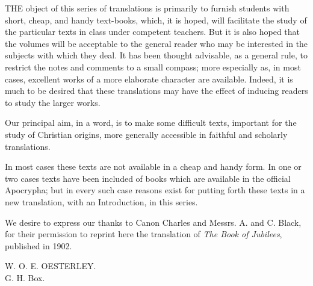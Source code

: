 
THE object of this series of translations is primarily to furnish students with short, cheap, and handy text-books, which, it is hoped, will facilitate the study of the particular texts in class under competent teachers. But it is also hoped that the volumes will be acceptable to the general reader who may be interested in the subjects with which they deal. It has been thought advisable, as a general rule, to restrict the notes and comments to a small compass; more especially as, in most cases, excellent works of a more elaborate character are available. Indeed, it is much to be desired that these translations may have the effect of inducing readers to study the larger works.

Our principal aim, in a word, is to make some difficult texts, important for the study of Christian origins, more generally accessible in faithful and scholarly translations.

In most cases these texts are not available in a cheap and handy form. In one or two cases texts have been included of books which are available in the official Apocrypha; but in every such case reasons exist for putting forth these texts in a new translation, with an Introduction, in this series.

We desire to express our thanks to Canon Charles and Messrs. A. and C. Black, for their permission to reprint here the translation of \emph{The Book of Jubilees}, published in 1902.

W. O. E. OESTERLEY.\\
G. H. Box.



